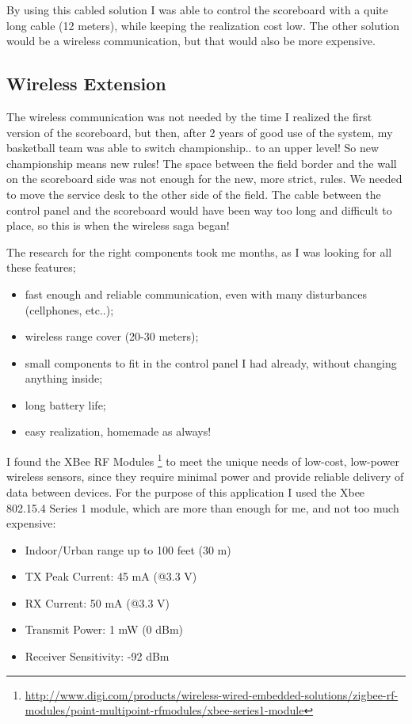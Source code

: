 \documentclass[11pt,english]{article}
\begin{document}
By using this cabled solution I was able to control the scoreboard with a quite long cable (12 meters), 
while keeping the realization cost low. The other solution would be a wireless communication, but that 
would also be more expensive.


\subsection{Wireless Extension}\label{subsec:hd-wireless}

The wireless communication was not needed by the time I realized the first version of the scoreboard, but 
then, after 2 years of good use of the system, my basketball team was able to switch championship.. to an 
upper level! So new championship means new rules!
The space between the field border and the wall on the scoreboard side was not enough for the new, more strict,
rules. We needed to move the service desk to the other side of the field. The cable between the control panel 
and the scoreboard would have been way too long and difficult to place, so this is when the wireless saga began!    

The research for the right components took me months, as I was looking for all these features;
\begin{itemize}
 \item fast enough and reliable communication, even with many disturbances (cellphones, etc..);
 \item wireless range cover (20-30 meters);
 \item small components to fit in the control panel I had already, without changing anything inside;
 \item long battery life;
 \item easy realization, homemade as always!
\end{itemize}

I found the XBee RF Modules \footnote{\url{http://www.digi.com/products/wireless-wired-embedded-solutions/zigbee-rf-modules/point-multipoint-rfmodules/xbee-series1-module}} to meet the unique needs of low-cost, low-power wireless sensors, 
since they require minimal power and provide reliable delivery of data between devices. For the purpose of this 
application I used the Xbee 802.15.4 Series 1 module, which are more than enough for me, and not too much expensive:

\begin{itemize}  
 \item Indoor/Urban range up to 100 feet (30 m) 
 \item TX Peak Current: 45 mA (@3.3 V)
 \item RX Current: 50 mA (@3.3 V)
 \item Transmit Power: 1 mW (0 dBm)
 \item Receiver Sensitivity: -92 dBm  
\end{itemize}
\end{document}
